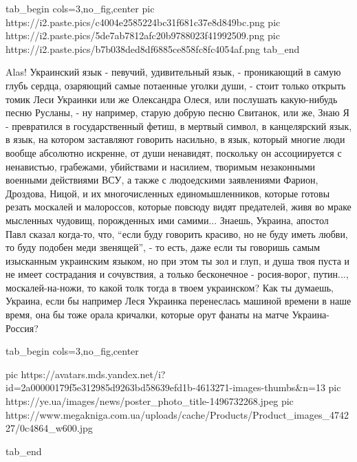 \ifcmt
  tab_begin cols=3,no_fig,center
     pic https://i2.paste.pics/c4004e2585224bc31f681c37e8d849bc.png
		 pic https://i2.paste.pics/5de7ab7812afc20b9788023f41992509.png
		 pic https://i2.paste.pics/b7b038ded8df6885ce858fc8fc4054af.png
  tab_end
\fi

Alas! Украинский язык - певучий, удивительный язык, - проникающий в самую глубь
сердца, озаряющий самые потаенные уголки души, - стоит только открыть томик
Леси Украинки или же Олександра Олеся, или послушать какую-нибудь песню
Русланы, - ну например, старую добрую песню Свитанок, или же, Знаю Я -
превратился в государственный фетиш, в мертвый символ, в канцелярский язык, в
язык, на котором заставляют говорить насильно, в язык, который многие люди
вообще абсолютно искренне, от души ненавидят, поскольку он ассоциируется с
ненавистью, грабежами, убийствами и насилием, творимым незаконными военными
действиями ВСУ, а также с людоедскими заявлениями Фарион, Дроздова, Ницой, и их
многочисленных единомышленников, которые готовы резать москалей и малороссов,
которые повсюду видят предателей, живя во мраке мысленных чудовищ, порожденных
ими самими... Знаешь, Украина, апостол Павл сказал когда-то, что, \enquote{если
буду говорить красиво, но не буду иметь любви, то буду подобен меди звенящей},
- то есть, даже если ты говоришь самым изысканным украинским языком, но при
этом ты зол и глуп, и душа твоя пуста и не имеет сострадания и сочувствия, а
только бесконечное - росия-ворог, путин..., москалей-на-ножи, то какой толк
тогда в твоем украинском? Как ты думаешь, Украина, если бы например Леся Украинка перенеслась
машиной времени в наше время, она бы тоже орала кричалки, которые орут фанаты
на матче Украина-Россия?

\ifcmt
  tab_begin cols=3,no_fig,center

     pic https://avatars.mds.yandex.net/i?id=2a00000179f5e312985d9263bd58639efd1b-4613271-images-thumbs&n=13
		 pic https://ye.ua/images/news/poster_photo_title-1496732268.jpeg
		 pic https://www.megakniga.com.ua/uploads/cache/Products/Product_images_474227/0c4864_w600.jpg

  tab_end
\fi
